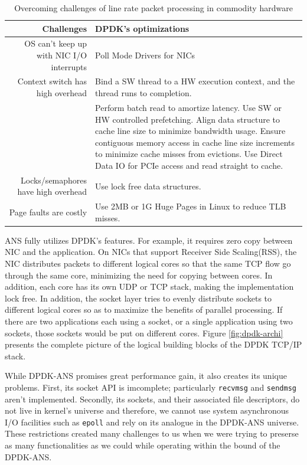 \documentclass{sig-alternate-05-2015}
\begin{document}
\begin{table}[ht]
\centering
\caption{Overcoming challenges of line rate packet processing in commodity hardware}
\label{tab:dpdkchallenges}
\begin{tabular}{|r|p{4in}|}
\hline
\textbf{Challenges} & \textbf{DPDK's optimizations}                                                           \\ \hline
OS can't keep up with NIC I/O interrupts & Poll Mode Drivers for NICs                                                                    \\ \hline
Context switch has high overhead & Bind a SW thread to a HW execution context, and the thread runs to completion.                               \\ \hline
\centering{Memory \& PCIe access is slow} & Perform batch read to amortize latency. Use SW or HW controlled prefetching. Align data structure to cache line size to minimize bandwidth usage. Ensure contiguous memory access in cache line size increments to minimize cache misses from evictions. Use Direct Data IO for PCIe access and read straight to cache.\\ \hline
Locks/semaphores have high overhead & Use lock free data structures. \\ \hline
Page faults are costly & Use 2MB or 1G Huge Pages in Linux to reduce TLB misses. \\ \hline
\end{tabular}
\end{table}

ANS fully utilizes DPDK's features. For example, it requires zero copy between NIC and the application. On NICs that support Receiver Side Scaling(RSS), the NIC distributes packets to different logical cores so that the same TCP flow go through the same core, minimizing the need for copying between cores. In addition, each core has its own UDP or TCP stack, making the implementation lock free. In addition, the socket layer tries to evenly distribute sockets to different logical cores so as to maximize the benefits of parallel processing. If there are two applications each using a socket, or a single application using two sockets, those sockets would be put on different cores. Figure \ref{fig:dpdk-archi} presents the complete picture of the logical building blocks of the DPDK TCP/IP stack. \cite{dpdkans:readme}
 
While DPDK-ANS promises great performance gain, it also creates its unique problems. First, its socket API is imcomplete; particularly \texttt{recvmsg} and \texttt{sendmsg} aren't implemented. Secondly, its sockets, and their associated file descriptors, do not live in kernel's universe and therefore, we cannot use system asynchronous I/O facilities such as \texttt{epoll} and rely on its analogue in the DPDK-ANS universe. These restrictions created many challenges to us when we were trying to preserse as many functionalities as we could while operating within the bound of the DPDK-ANS.
\end{document}
